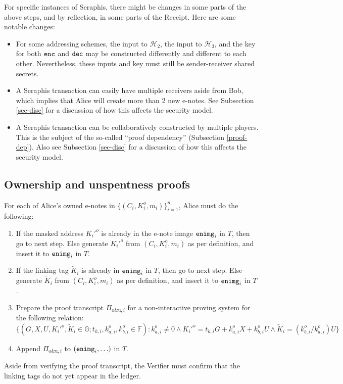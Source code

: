 \documentclass{article}
\begin{document}
For specific instances of Seraphis, there might be changes in some parts of the above steps, and by reflection, in some parts of the Receipt. Here are some notable changes:
\begin{itemize}
\item For some addressing schemes, the input to $\mathcal{H}_2$, the input to $\mathcal{H}_3$, and the key for both ${\tt enc}$ and ${\tt dec}$ may be constructed differently and different to each other. Nevertheless, these inputs and key must still be sender-receiver shared secrets.
\item A Seraphis transaction can easily have multiple receivers aside from Bob, which implies that Alice will create more than 2 new e-notes. See Subsection \ref{sec-disc} for a discussion of how this affects the security model.
\item A Seraphis transaction can be collaboratively constructed by multiple players. This is the subject of the so-called ``proof dependency'' (Subsection \ref{proof-dep}). Also see Subsection \ref{sec-disc} for a discussion of how this affects the security model.
\end{itemize}

\subsection{Ownership and unspentness proofs}\label{own-unsp}
For each of Alice's owned e-notes in $\{(C_i,K_i^o,m_i)\}_{i=1}^n$, Alice must do the following:
\begin{enumerate}
    \item If the masked address $K_i'^o$ is already in the e-note image ${\tt enimg}_i$ in $T$, then go to next step. Else generate $K_i'^o$ from $(C_i, K_i^o, m_i)$ as per definition, and insert it to ${\tt enimg}_i$ in $T$.
    \item If the linking tag $\tilde{K}_i$ is already in ${\tt enimg}_i$ in $T$, then go to next step. Else generate $\tilde{K}_i$ from $(C_i, K_i^o, m_i)$ as per definition, and insert it to ${\tt enimg}_i$ in $T$.
    \item Prepare the proof transcript $\Pi_{\text{o\&u}, i}$ for a non-interactive proving system for the following relation:
$$\{(G, X, U, K_i'^o, \tilde{K}_i\in\mathbb{G}; t_{k,i}, k_{a,i}^o, k_{b,i}^o\in\mathbb{F}): k_{a,i}^o \ne 0 \wedge K_i'^o = t_{k,i} G + k_{a,i}^o X + k_{b,i}^o U \wedge \tilde{K}_i = (k_{b,i}^o/k_{a,i}^o)U \}$$
    \item Append $\Pi_{\text{o\&u}, i}$ to $({\tt enimg}_i, \ldots)$ in $T$.
\end{enumerate}
Aside from verifying the proof transcript, the Verifier must confirm that the linking tags do not yet appear in the ledger.
\end{document}
